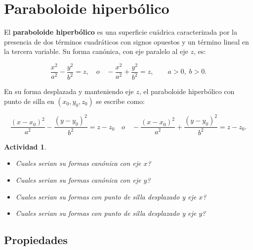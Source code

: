 \documentclass[11pt]{article}
\newtheorem{act}{Actividad}%
\begin{document}
\section{Paraboloide hiperbólico}

El \textbf{paraboloide hiperbólico} es una superficie cuádrica caracterizada por la presencia de dos
términos cuadráticos con signos opuestos y un término lineal en la tercera variable.  
Su forma canónica, con eje paralelo al eje $z$, es:

\[
\frac{x^{2}}{a^{2}} - \frac{y^{2}}{b^{2}} = z,
\quad o \quad 
-\frac{x^{2}}{a^{2}} + \frac{y^{2}}{b^{2}} = z,
\qquad a>0,\; b>0.
\]

En su forma desplazada y manteniendo eje $z$, el paraboloide hiperbólico con punto de silla en
$(x_0,y_0,z_0)$ se escribe como:

\[
\frac{(x - x_0)^{2}}{a^{2}} - \frac{(y - y_0)^{2}}{b^{2}} = z - z_0
\quad o \quad 
-\frac{(x - x_0)^{2}}{a^{2}} + \frac{(y - y_0)^{2}}{b^{2}} = z - z_0.
\]







\begin{act}
\begin{itemize}
    \item Cuales serian su formas canónica con eje $x$?
    \item Cuales serian su formas canónica con eje $y$?
    \item Cuales serian su formas con punto de silla  desplazado y  eje $x$?
    \item Cuales serian su formas con punto de silla  desplazado y  eje $y$? 
\end{itemize}
\end{act}














\subsection*{Propiedades}
\end{document}
